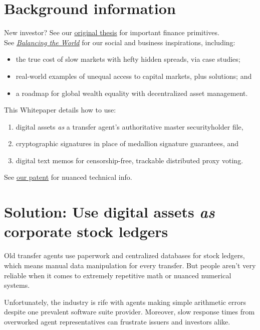 \documentclass[11pt, english]{article}
\begin{document}
\begin{multicols}{2}
\section{Background information}

New investor? See our \underline{\href{http://thesis.blocktransfer.io}{original thesis}} for important finance primitives.\\

\noindent See \href{http://impact.blocktransfer.io}{\underline{\textit{Balancing the World}}} for our social and business inspirations, including:
\begin{itemize}
    \item the true cost of slow markets with hefty hidden spreads, via case studies;
    
    \item real-world examples of unequal access to capital markets, plus solutions; and
    
    \item a roadmap for global wealth equality with decentralized asset management.
\end{itemize}

\noindent This Whitepaper details how to use: \begin{enumerate}
    \item digital assets \textit{as} a transfer agent's authoritative master securityholder file,
    
    \item cryptographic signatures in place of medallion signature guarantees, and
    
    \item digital text memos for censorship-free, trackable distributed proxy voting.
\end{enumerate}
See \underline{\href{https://patentcenter.uspto.gov/applications/17396742}{our patent}} for nuanced technical info.



\section{Solution: Use digital assets \textit{as} corporate stock ledgers}

Old transfer agents use paperwork and centralized databases for stock ledgers, which means manual data manipulation for every transfer. But people aren't very reliable when it comes to extremely repetitive math or nuanced numerical systems.

Unfortunately, the industry is rife with agents making simple arithmetic errors despite one prevalent software suite provider. Moreover, slow response times from overworked agent representatives can frustrate issuers and investors alike.


\end{multicols}
\end{document}
